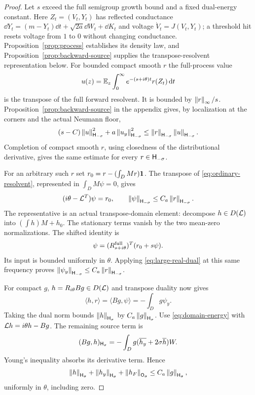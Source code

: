 \begin{proof}
Let $s$ exceed the full semigroup growth bound and a fixed dual-energy
constant. Here $Z_t=(V_t,Y_t)$ has reflected conductance
$\dd Y_t=(m-Y_t)\dd t+\sqrt{2a}\dd W_t+\dd K_t$ and voltage
$\dot V_t=J(V_t,Y_t)$; a threshold hit resets voltage from $1$ to $0$
without changing conductance. Proposition~\ref{prop:process} establishes
its density law, and Proposition~\ref{prop:backward-source} supplies
the transpose-resolvent representation below.
For bounded compact smooth $r$ the full-process value
\[
 u(z)=\mathbb E_z\int_0^\infty e^{-(s+i\theta)t}r(Z_t)\,\mathrm d t
\]
is the transpose of the full forward resolvent. It is bounded by
$\left\|r\right\|_\infty/s$. Proposition~\ref{prop:backward-source} in the appendix
gives, by localization at the corners and the actual Neumann floor,
\begin{equation}\label{eq:large-real-dual}
 (s-C)\left\|u\right\|_{\mathsf H_{-\sigma}}^2+
 a\left\|u_y\right\|_{\mathsf H_{-\sigma}}^2
 \le\left\|r\right\|_{\mathsf H_{-\sigma}}\left\|u\right\|_{\mathsf H_{-\sigma}}.
\end{equation}
Completion of compact smooth $r$, using closedness of the distributional
derivative, gives the same estimate for every $r\in\mathsf H_{-\sigma}$.

For an arbitrary such $r$ set $r_0=r-(\int_DMr)\mathbf 1$. The transpose of
\eqref{eq:ordinary-resolvent}, represented in $\int_D M\psi=0$, gives
\[
 (i\theta-\mathcal L^T)\psi=r_0,\qquad
 \left\|\psi\right\|_{\mathsf H_{-\sigma}}\le C_a\left\|r\right\|_{\mathsf H_{-\sigma}}.
\]
The representative is an actual transpose-domain element: decompose
$h\in D(\mathcal L)$ into $(\int h)M+h_0$. The stationary terms vanish by the
two mean-zero normalizations. The shifted identity is
\[
 \psi=(R^{\rm full}_{s+i\theta})^T(r_0+s\psi).
\]
Its input is bounded uniformly in $\theta$. Applying
\eqref{eq:large-real-dual} at this same frequency proves
$\left\|\psi_y\right\|_{\mathsf H_{-\sigma}}\le C_a\left\|r\right\|_{\mathsf H_{-\sigma}}$.

For compact $g$, $h=R_{i\theta}Bg\in D(\mathcal L)$ and transpose duality now
gives
\[
 \langle h,r\rangle=\langle Bg,\psi\rangle=-\int_Dg\psi_y.
\]
Taking the dual norm bounds $\left\|h\right\|_{\mathsf H_\sigma}$ by $C_a\left\|g\right\|_{\mathsf H_\sigma}$.
Use \eqref{eq:domain-energy} with
$\mathcal L h=i\theta h-Bg$. The remaining source term is
\[
 (Bg,h)_{\mathsf H_\sigma}
   =-\int_Dg(\overline{h_y}+2\sigma\overline h)W.
\]
Young's inequality absorbs its derivative term. Hence
\begin{equation}\label{eq:triple-bound}
 \left\|h\right\|_{\mathsf H_\sigma}+\left\|h_y\right\|_{\mathsf H_\sigma}
       +\left\|h_F\right\|_{\mathsf O_\sigma}\le C_a\left\|g\right\|_{\mathsf H_\sigma},
\end{equation}
uniformly in $\theta$, including zero.


\end{proof}
